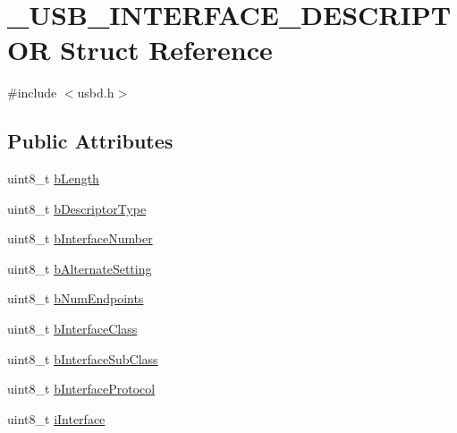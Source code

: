 \hypertarget{struct___u_s_b___i_n_t_e_r_f_a_c_e___d_e_s_c_r_i_p_t_o_r}{}\section{\+\_\+\+U\+S\+B\+\_\+\+I\+N\+T\+E\+R\+F\+A\+C\+E\+\_\+\+D\+E\+S\+C\+R\+I\+P\+T\+OR Struct Reference}
\label{struct___u_s_b___i_n_t_e_r_f_a_c_e___d_e_s_c_r_i_p_t_o_r}


{\ttfamily \#include $<$usbd.\+h$>$}

\subsection*{Public Attributes}
\begin{DoxyCompactItemize}
\item 
uint8\+\_\+t \hyperlink{struct___u_s_b___i_n_t_e_r_f_a_c_e___d_e_s_c_r_i_p_t_o_r_a16fbd548f47d86ea2c045da5a091ed79}{b\+Length}
\item 
uint8\+\_\+t \hyperlink{struct___u_s_b___i_n_t_e_r_f_a_c_e___d_e_s_c_r_i_p_t_o_r_a37b3f11033507a50c072cefb0000a8f4}{b\+Descriptor\+Type}
\item 
uint8\+\_\+t \hyperlink{struct___u_s_b___i_n_t_e_r_f_a_c_e___d_e_s_c_r_i_p_t_o_r_a1cd05be188c8776aaa33029e0e7e8c32}{b\+Interface\+Number}
\item 
uint8\+\_\+t \hyperlink{struct___u_s_b___i_n_t_e_r_f_a_c_e___d_e_s_c_r_i_p_t_o_r_aa596036a18b317c3dbeb9ea417938a43}{b\+Alternate\+Setting}
\item 
uint8\+\_\+t \hyperlink{struct___u_s_b___i_n_t_e_r_f_a_c_e___d_e_s_c_r_i_p_t_o_r_a9972081626557a77abd11258cc75684b}{b\+Num\+Endpoints}
\item 
uint8\+\_\+t \hyperlink{struct___u_s_b___i_n_t_e_r_f_a_c_e___d_e_s_c_r_i_p_t_o_r_a21d6fc8a0a868dc4061084f9d0f62684}{b\+Interface\+Class}
\item 
uint8\+\_\+t \hyperlink{struct___u_s_b___i_n_t_e_r_f_a_c_e___d_e_s_c_r_i_p_t_o_r_af88328ec7f751751f3397df1c4c032b2}{b\+Interface\+Sub\+Class}
\item 
uint8\+\_\+t \hyperlink{struct___u_s_b___i_n_t_e_r_f_a_c_e___d_e_s_c_r_i_p_t_o_r_a12f09e3be7c323bbd776f75af515ec7f}{b\+Interface\+Protocol}
\item 
uint8\+\_\+t \hyperlink{struct___u_s_b___i_n_t_e_r_f_a_c_e___d_e_s_c_r_i_p_t_o_r_a69b79c8ff54fe5c4ce9e0517923332a5}{i\+Interface}
\end{DoxyCompactItemize}


